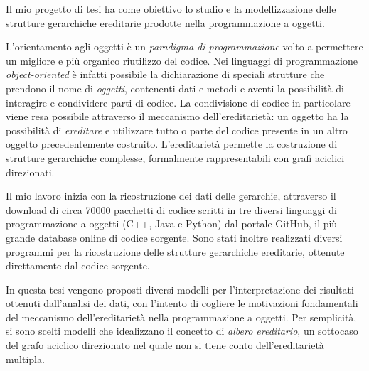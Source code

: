 \documentclass[12pt, a4paper, oneside]{book}
\begin{document}

Il mio progetto di tesi ha come obiettivo lo studio e la modellizzazione delle strutture gerarchiche ereditarie prodotte nella programmazione a oggetti.

\vspace{0.3cm}
L'orientamento agli oggetti è un \textit{paradigma di programmazione} volto a permettere un migliore e più organico riutilizzo del codice. Nei linguaggi di programmazione \textit{object-oriented} è infatti possibile la dichiarazione di speciali strutture che prendono il nome di \textit{oggetti}, contenenti dati e metodi e aventi la possibilità di interagire e condividere parti di codice. La condivisione di codice in particolare viene resa possibile attraverso il meccanismo dell'ereditarietà: un oggetto ha la possibilità di \textit{ereditare} e utilizzare tutto o parte del codice presente in un altro oggetto precedentemente costruito. L'ereditarietà permette la costruzione di strutture gerarchiche complesse, formalmente rappresentabili con grafi aciclici direzionati.

\vspace{0.3cm}
Il mio lavoro inizia con la ricostruzione dei dati delle gerarchie, attraverso il download di circa 70000 pacchetti di codice scritti in tre diversi linguaggi di programmazione a oggetti (C++, Java e Python) dal portale GitHub, il più grande database online di codice sorgente. Sono stati inoltre realizzati diversi programmi per la ricostruzione delle strutture gerarchiche ereditarie, ottenute direttamente dal codice sorgente.
%

\vspace{0.3cm}
In questa tesi vengono proposti diversi modelli per l'interpretazione dei risultati ottenuti dall'analisi dei dati, con l'intento di cogliere le motivazioni fondamentali del meccanismo dell'ereditarietà nella programmazione a oggetti. Per semplicità, si sono scelti modelli che idealizzano il concetto di \textit{albero ereditario}, un sottocaso del grafo aciclico direzionato nel quale non si tiene conto dell'ereditarietà multipla.
\end{document}
